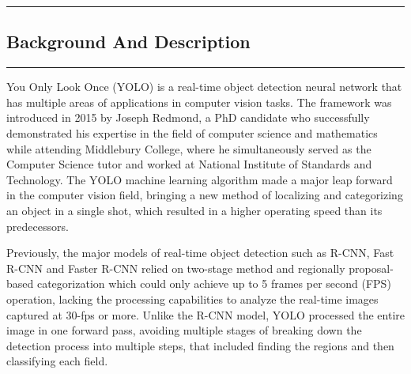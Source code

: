 {\color{gray}\hrule}
\begin{center}
\section{Background And Description}
\bigskip
\end{center}
{\color{gray}\hrule}
\begin{multicols}{2}

You Only Look Once (YOLO) is a real-time object detection neural network that has multiple areas of applications in computer vision tasks. The framework was introduced in 2015 by Joseph Redmond, a PhD candidate who successfully demonstrated his expertise in the field of computer science and mathematics while attending Middlebury College, where he simultaneously served as the Computer Science tutor and worked at National Institute of Standards and Technology. The YOLO machine learning algorithm made a major leap forward in the computer vision field, bringing a new method of localizing and categorizing an object in a single shot, which resulted in a higher operating speed than its predecessors. 

Previously, the major models of real-time object detection such as R-CNN, Fast R-CNN and Faster R-CNN relied on two-stage method and regionally proposal-based categorization which could only achieve up to 5 frames per second (FPS) operation, lacking the processing capabilities to analyze the real-time images captured at 30-fps or more. Unlike the R-CNN model, YOLO processed the entire image in one forward pass, avoiding multiple stages of breaking down the detection process into multiple steps, that included finding the regions and then classifying each field.


\end{multicols}
